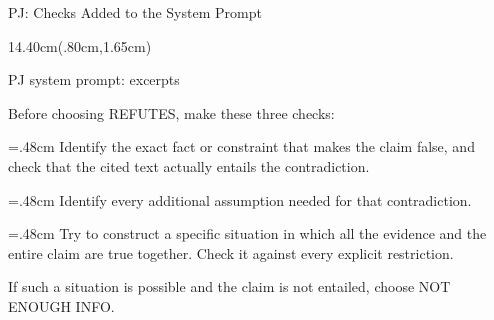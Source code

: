 \documentclass[aspectratio=169,10pt]{beamer}
\newcommand{\GridLeft}{.80cm}
\newcommand{\GridWidth}{14.40cm}
\newcommand{\GridTop}{1.65cm}
\newenvironment{pane}[3]{%
  \begin{textblock*}{#3}(#1,#2)%
  \raggedright\fontsize{9.8}{12.6}\selectfont
  \setlength{\parindent}{0pt}\setlength{\parskip}{0pt}%
  \hyphenpenalty=10000\exhyphenpenalty=10000\relax
}{\par\end{textblock*}}
\newenvironment{widepane}{\begin{pane}{\GridLeft}{\GridTop}{\GridWidth}}{\end{pane}}
\newcommand{\panelhead}[1]{\par{\color{Blue}\fontsize{10.1}{12.5}\selectfont\bfseries\strut #1\par}\vspace{.12cm}}
\newcommand{\promptitem}[2]{\par\hangindent=.48cm\hangafter=1
  \makebox[.48cm][l]{\textcolor{Blue}{\bfseries #1.}}#2\par}
\begin{document}
\begin{frame}[t]{PJ: Checks Added to the System Prompt}
\begin{widepane}
\panelhead{PJ system prompt: excerpts}
\fontsize{10.1}{13.6}\selectfont
Before choosing REFUTES, make these three checks:
\par\vspace{.31cm}
\promptitem{1}{Identify the exact fact or constraint that makes the claim false, and check that the cited text actually entails the contradiction.}
\par\vspace{.31cm}
\promptitem{2}{Identify every additional assumption needed for that contradiction.}
\par\vspace{.31cm}
\promptitem{3}{Try to construct a specific situation in which all the evidence and the entire claim are true together. Check it against every explicit restriction.}
\par\vspace{.31cm}
If such a situation is possible and the claim is not entailed, choose NOT ENOUGH INFO.
\end{widepane}
\end{frame}
\end{document}
